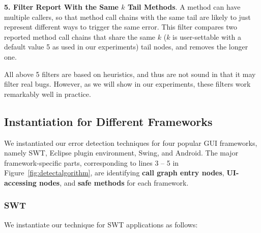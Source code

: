 \textbf{5. Filter Report With the Same $k$ Tail Methods}. A method
can have multiple callers, so that method call chains with the same tail are likely
to just represent different ways to trigger the same error. This filter compares 
two reported method call chains that share the same 
$k$ ($k$ is user-settable with a default value 5 as used in our
experiments) tail nodes, and removes the longer one.


\vspace{1mm}

All above 5 filters are based on heuristics, and thus are not sound in
that it may filter real bugs. However, as we will show in
our experiments, these filters work remarkably well in practice.


\subsection{Instantiation for Different Frameworks}
\label{sec:platforms}

We instantiated our error detection techniques for four popular GUI frameworks,
namely SWT, Eclipse plugin environment, Swing, and Android.
The major framework-specific parts, corresponding to
lines 3 -- 5 in Figure~\ref{fig:detectalgorithm}, are identifying
\textbf{call graph entry nodes}, \textbf{UI-accessing nodes},
and \textbf{safe methods} for each framework.





\subsubsection{SWT}

 We instantiate our technique for SWT applications as follows:

